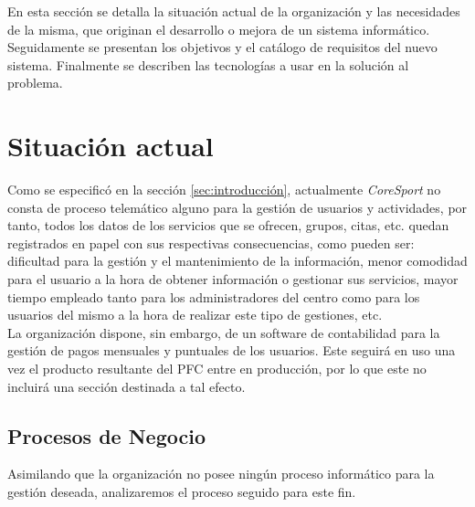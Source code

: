 

En esta sección se detalla la situación actual de la organización y las necesidades de la misma, que originan el desarrollo o mejora de un sistema informático. Seguidamente se presentan los objetivos y el catálogo de requisitos del nuevo sistema. Finalmente se describen las tecnologías a usar en la solución al problema.

\section{Situación actual} 

Como se especificó en la sección \ref{sec:introducción}, actualmente \textsl{CoreSport} no consta de proceso telemático alguno para la gestión de usuarios y actividades, por tanto, todos los datos de los servicios que se ofrecen, grupos, citas, etc. quedan registrados en papel con sus respectivas consecuencias, como pueden ser: dificultad para la gestión y el mantenimiento de la información, menor comodidad para el usuario a la hora de obtener información o gestionar sus servicios, mayor tiempo empleado tanto para los administradores del centro como para los usuarios del mismo a la hora de realizar este tipo de gestiones, etc.
\\

La organización dispone, sin embargo, de un software de contabilidad para la gestión de pagos mensuales y puntuales de los usuarios. Este seguirá en uso una vez el producto resultante del PFC entre en producción, por lo que este no incluirá una sección destinada a tal efecto.

\subsection{Procesos de Negocio}\label{subsec:procesosnegocios}

Asimilando que la organización no posee ningún proceso informático para la gestión deseada, analizaremos el proceso seguido para este fin. 
\\

